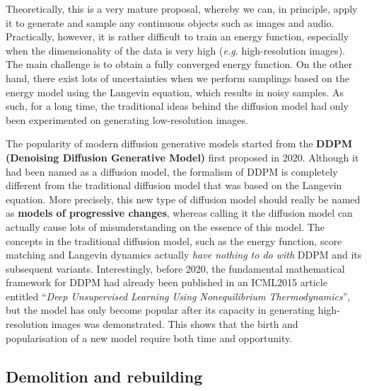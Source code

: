 Theoretically, this is a very mature proposal, whereby we can, in principle, apply it to generate and sample any continuous objects such as images and audio. Practically, however, it is rather difficult to train an energy function, especially when the dimensionality of the data is very high (\emph{e.g.} high-resolution images). The main challenge is to obtain a fully converged energy function. On the other hand, there exist lots of uncertainties when we perform samplings based on the energy model using the Langevin equation, which results in noisy samples. As such, for a long time, the traditional ideas behind the diffusion model had only been experimented on generating low-resolution images. 

The popularity of modern diffusion generative models started from the \textbf{DDPM (Denoising Diffusion Generative Model)}\cite{ho2020denoising} first proposed in 2020. Although it had been named as a diffusion model, the formalism of DDPM is completely different from the traditional diffusion model that was based on the Langevin equation. More precisely, this new type of diffusion model should really be named as \textbf{models of progressive changes}, whereas calling it the diffusion model can actually cause lots of misunderstanding on the essence of this model. The concepts in the traditional diffusion model, such as the energy function, score matching and Langevin dynamics actually \emph{have nothing to do with} DDPM and its subsequent variants. Interestingly, before 2020, the fundamental mathematical framework for DDPM had already been published in an ICML2015 article\cite{sohl2015deep} entitled ``\emph{Deep Unsupervised Learning Using Nonequilibrium Thermodynamics}'', but the model has only become popular after its capacity in generating high-resolution images was demonstrated. This shows that the birth and popularisation of a new model require both time and opportunity.

\subsection{Demolition and rebuilding}

